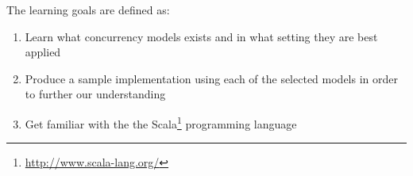 The learning goals are defined as:
\begin{enumerate}
\item Learn what concurrency models exists and in what setting they are best applied
\item Produce a sample implementation using each of the selected models in order to further our understanding
\item Get familiar with the the Scala\footnote{\url{http://www.scala-lang.org/}} programming language
\end{enumerate}

\worksheetend